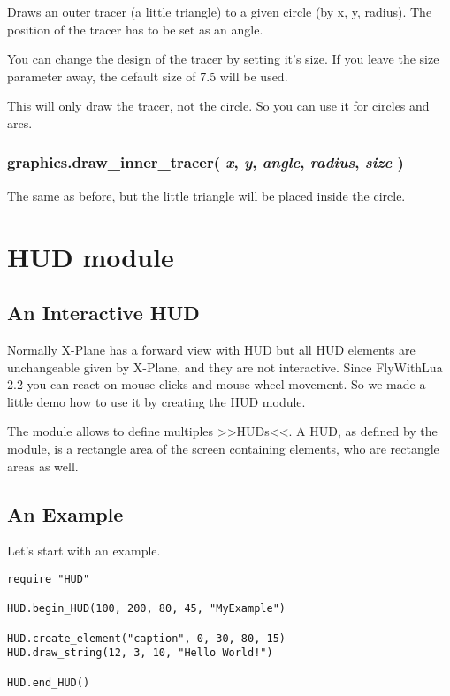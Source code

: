 \documentclass[11pt,parskip=half,a4paper]{scrartcl}
\begin{document}
Draws an outer tracer (a little triangle) to a given circle (by x, y, radius). The position of the tracer has to be set as an angle.

You can change the design of the tracer by setting it's size. If you leave the size parameter away, the default size of 7.5 will be used.

This will only draw the tracer, not the circle. So you can use it for circles and arcs.

\subsubsection{graphics.draw\_inner\_tracer( \emph{x}, \emph{y}, \emph{angle}, \emph{radius}, \emph{size} )}

The same as before, but the little triangle will be placed inside the circle.

\newpage
\section{HUD module}

\subsection{An Interactive HUD}

Normally X-Plane has a forward view with HUD but all HUD elements are unchangeable given by X-Plane, and they are not interactive. Since FlyWithLua 2.2 you can react on mouse clicks and mouse wheel movement. So we made a little demo how to use it by creating the HUD module.

The module allows to define multiples >>HUDs<<. A HUD, as defined by the module, is a rectangle area of the screen containing elements, who are rectangle areas as well.

\subsection{An Example}

Let's start with an example.

\begin{lstlisting}[firstnumber=1]
require "HUD"

HUD.begin_HUD(100, 200, 80, 45, "MyExample")

HUD.create_element("caption", 0, 30, 80, 15)
HUD.draw_string(12, 3, 10, "Hello World!")

HUD.end_HUD()
\end{lstlisting}
\end{document}
